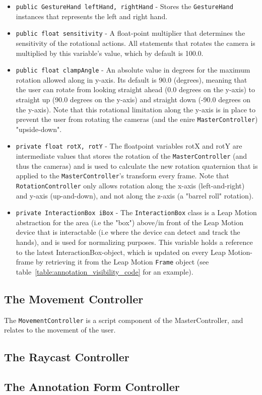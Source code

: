 \begin{itemize}
    \item \texttt{public GestureHand leftHand, rightHand} - Stores the \texttt{GestureHand} instances that represents the left and right hand.
    \item \texttt{public float sensitivity} - A float-point multiplier that determines the sensitivity of the rotational actions. 
                                              All statements that rotates the camera is multiplied by this variable's value, which by default is 100.0.
    \item \texttt{public float clampAngle} - An absolute value in degrees for the maximum rotation allowed along in y-axis. 
                                            Its default is 90.0 (degrees), meaning that the user can rotate from looking straight ahead (0.0 degrees on the y-axis) to 
                                            straight up (90.0 degrees on the y-axis) and straight down (-90.0 degrees on the y-axis). Note that this rotational 
                                            limitation along the y-axis is in place to prevent the user from rotating the cameras (and the enire \texttt{MasterController}) 
                                            "upside-down". %
    \item \texttt{private float rotX, rotY} - The floatpoint variables rotX and rotY are intermediate values that stores the rotation of the \texttt{MasterController} (and thus the
                                              cameras) and is used to calculate the new rotation quaternion that is applied to the \texttt{MasterController}'s transform 
                                              every frame. Note that \texttt{RotationController} only allows rotation
                                              along the x-axis (left-and-right) and y-axis (up-and-down), and not along the z-axis (a "barrel roll" rotation). 
    \item \texttt{private InteractionBox iBox} - The \texttt{InteractionBox} class is a Leap Motion abstraction for the area (i.e the "box") above/in front of 
                                                the Leap Motion device that is interactable (i.e where the device can detect and track the hands), 
                                                and is used for normalizing purposes. 
                                                This variable holds a reference to the latest InteractionBox-object, which is updated on every Leap Motion-frame by
                                                retrieving it from the Leap Motion \texttt{Frame} object (see table~\vref{table:annotation_visibility_code} for an example).  
\end{itemize}


\subsection{The Movement Controller}
The \texttt{MovementController} is a script component of the MasterController, and relates to the movement of the user.

\subsection{The Raycast Controller}

\subsection{The Annotation Form Controller}
